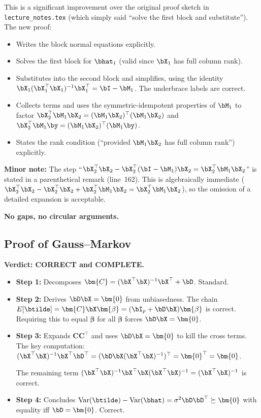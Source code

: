 This is a significant improvement over the original proof sketch in
\texttt{lecture\_notes.tex} (which simply said ``solve the first block
and substitute'').  The new proof:

\begin{itemize}[nosep]
  \item Writes the block normal equations explicitly. \checkmark
  \item Solves the first block for $\bhat_1$ (valid since $\bX_1$ has
        full column rank). \checkmark
  \item Substitutes into the second block and simplifies, using the
        identity $\bX_1(\bX_1^\top\bX_1)^{-1}\bX_1^\top = \bI - \bM_1$.
        The underbrace labels are correct. \checkmark
  \item Collects terms and uses the symmetric-idempotent properties of
        $\bM_1$ to factor $\bX_2^\top\bM_1\bX_2 = (\bM_1\bX_2)^\top(\bM_1\bX_2)$
        and $\bX_2^\top\bM_1\by = (\bM_1\bX_2)^\top(\bM_1\by)$. \checkmark
  \item States the rank condition (``provided $\bM_1\bX_2$ has full column
        rank'') explicitly. \checkmark
\end{itemize}

\textbf{Minor note:}
The step ``$\bX_2^\top\bX_2 - \bX_2^\top(\bI-\bM_1)\bX_2 = \bX_2^\top\bM_1\bX_2$''
is stated in a parenthetical remark (line~162).  This is algebraically
immediate ($\bX_2^\top\bX_2 - \bX_2^\top\bX_2 + \bX_2^\top\bM_1\bX_2 =
\bX_2^\top\bM_1\bX_2$), so the omission of a detailed expansion is acceptable.

\textbf{No gaps, no circular arguments.}


\subsection*{Proof of Gauss--Markov}

\textbf{Verdict: CORRECT and COMPLETE.}

\begin{itemize}[nosep]
  \item \textbf{Step 1:}  Decomposes $\bm{C} = (\bX^\top\bX)^{-1}\bX^\top + \bD$.  Standard. \checkmark
  \item \textbf{Step 2:}  Derives $\bD\bX = \bm{0}$ from unbiasedness.
        The chain $E[\btilde] = \bm{C}\bX\bm{\beta} = (\bI_p + \bD\bX)\bm{\beta}$
        is correct.  Requiring this to equal $\bm{\beta}$ for all $\bm{\beta}$
        forces $\bD\bX = \bm{0}$. \checkmark
  \item \textbf{Step 3:}  Expands $\bm{C}\bm{C}^\top$ and uses $\bD\bX = \bm{0}$
        to kill the cross terms.  The key computation:
        $(\bX^\top\bX)^{-1}\bX^\top\bD^\top = (\bD\bX(\bX^\top\bX)^{-1})^\top
        = \bm{0}^\top = \bm{0}$. \checkmark

        The remaining term $(\bX^\top\bX)^{-1}\bX^\top\bX(\bX^\top\bX)^{-1}
        = (\bX^\top\bX)^{-1}$ is correct. \checkmark
  \item \textbf{Step 4:}  Concludes $\text{Var}(\btilde) - \text{Var}(\bhat)
        = \sigma^2\bD\bD^\top \succeq \bm{0}$ with equality iff $\bD = \bm{0}$.
        Correct. \checkmark
\end{itemize}

